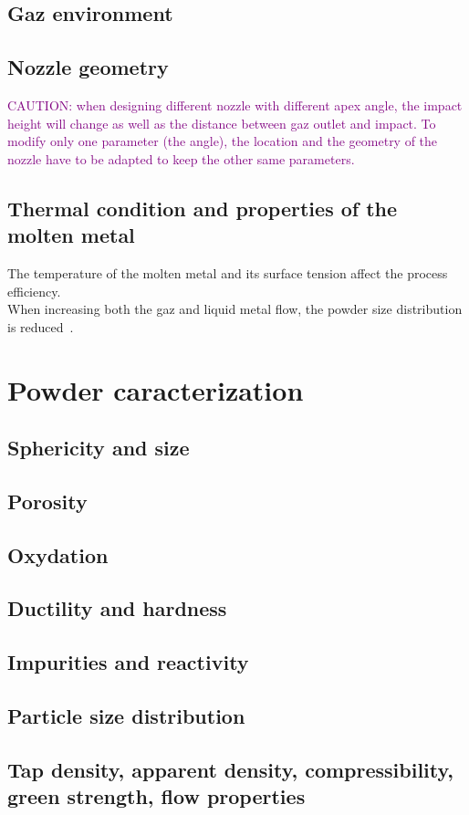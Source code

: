 \subsection{Gaz environment}
\label{s:gaz_env}


\subsection{Nozzle geometry}

\textcolor{Purple}{CAUTION: when designing different nozzle with different apex angle, the impact height will change as well as the distance between gaz outlet and impact. To modify only one parameter (the angle), the location and the geometry of the nozzle have to be adapted to keep the other same parameters.}


\subsection{Thermal condition and properties of the molten metal}

The temperature of the molten metal and its surface tension affect the process efficiency.\\
When increasing both the gaz and liquid metal flow, the powder size distribution is reduced~\cite{Kassym2020Atomizationprocesses}.


\section{Powder caracterization}

\subsection{Sphericity and size}
\subsection{Porosity}
\subsection{Oxydation}
\subsection{Ductility and hardness}
\subsection{Impurities and reactivity}
\subsection{Particle size distribution}
\subsection{Tap density, apparent density, compressibility, green strength, flow properties}
